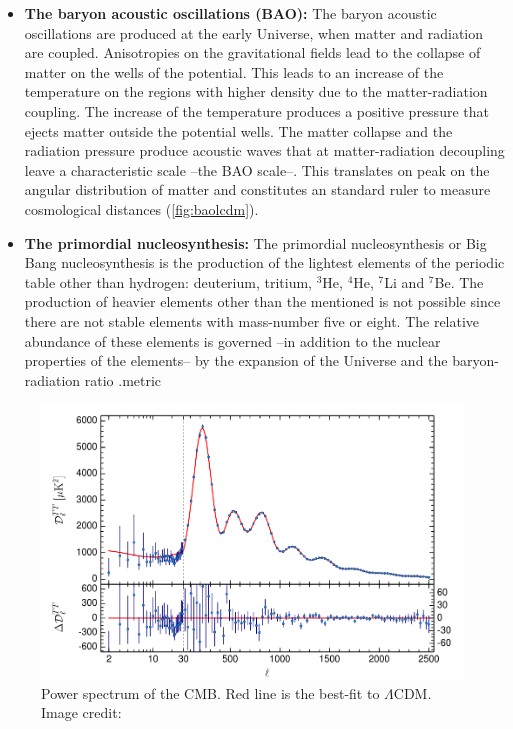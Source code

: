 \begin{itemize}
\item {\bf The baryon acoustic oscillations (BAO):} The baryon acoustic oscillations are produced at the early Universe, when matter and radiation are coupled. Anisotropies on the gravitational fields lead to the collapse of matter on the wells of the potential. This leads to an increase of the temperature on the regions with higher density due to the matter-radiation coupling. The increase of the temperature produces a positive pressure that ejects matter outside the potential wells. The matter collapse and the radiation pressure produce acoustic waves that at matter-radiation decoupling leave a characteristic scale --the BAO scale--. This translates on peak on the angular distribution of matter and constitutes an standard ruler to measure cosmological distances (\autoref{fig:baolcdm}).

\item {\bf The primordial nucleosynthesis:} The primordial nucleosynthesis or Big Bang nucleosynthesis is the production of the lightest elements of the periodic table other than hydrogen: deuterium, tritium, $^3$He, $^4$He, $^7$Li and $^7$Be. The production of heavier elements other than the mentioned is not possible since there are not stable elements with mass-number five or eight. The relative abundance of these elements is governed --in addition to the nuclear properties of the elements-- by the expansion of the Universe and the baryon-radiation ratio \cite{2006IJMPE..15....1S}.metric
\end{itemize}

\begin{figure}
\includegraphics[width=\textwidth]{./Pictures/CMB_pk.png}
\caption{Power spectrum of the CMB. Red line is the best-fit to $\Lambda$CDM. Image credit: \cite{2015arXiv150201589P}}
\label{fig:cmbpk}
\end{figure}

